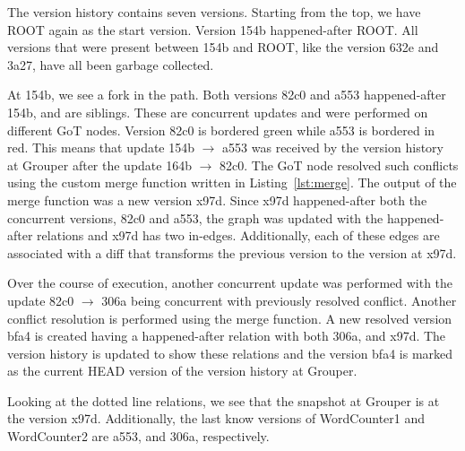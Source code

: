 The version history contains seven versions. Starting from the top, we have ROOT again as the start version. Version 154b happened-after ROOT. All versions that were present between 154b and ROOT, like the version 632e and 3a27, have all been garbage collected. 

At 154b, we see a fork in the path. Both versions 82c0 and a553 happened-after 154b, and are siblings. These are concurrent updates and were performed on different GoT nodes. Version 82c0 is bordered green while a553 is bordered in red. This means that update 154b $\rightarrow$ a553 was received by the version history at Grouper after the update 164b $\rightarrow$ 82c0. The GoT node resolved such conflicts using the custom merge function written in Listing~\ref{lst:merge}. The output of the merge function was a new version x97d. Since x97d happened-after both the concurrent versions, 82c0 and a553, the graph was updated with the happened-after relations and x97d has two in-edges. Additionally, each of these edges are associated with a diff that transforms the previous version to the version at x97d.

Over the course of execution, another concurrent update was performed with the update 82c0 $\rightarrow$ 306a being concurrent with previously resolved conflict. Another conflict resolution is performed using the merge function. A new resolved version bfa4 is created having a happened-after relation with both 306a, and x97d. The version history is updated to show these relations and the version bfa4 is marked as the current HEAD version of the version history at Grouper.

Looking at the dotted line relations, we see that the snapshot at Grouper is at the version x97d. Additionally, the last know versions of WordCounter1 and WordCounter2 are a553, and 306a, respectively.

